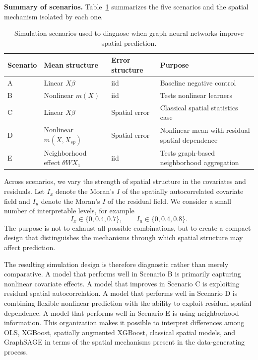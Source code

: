 \documentclass[ASNA, twocolumn]{USG} %
\begin{document}
\noindent \textbf{Summary of scenarios.}
Table~\ref{tab:simulation_scenarios} summarizes the five scenarios and the spatial mechanism isolated by each one.

\begin{table}[t]
\centering
\caption{Simulation scenarios used to diagnose when graph neural networks improve spatial prediction.}
\label{tab:simulation_scenarios}
\begin{tabular}{llll}
\toprule
Scenario & Mean structure & Error structure & Purpose \\
\midrule
A & Linear \(X\beta\) & iid & Baseline negative control \\
B & Nonlinear \(m(X)\) & iid & Tests nonlinear learners \\
C & Linear \(X\beta\) & Spatial error & Classical spatial statistics case \\
D & Nonlinear \(m(X,X_{sp})\) & Spatial error & Nonlinear mean with residual spatial dependence \\
E & Neighborhood effect \(\theta WX_1\) & iid & Tests graph-based neighborhood aggregation \\
\bottomrule
\end{tabular}
\end{table}

Across scenarios, we vary the strength of spatial structure in the covariates and residuals. Let \(I_x\) denote the Moran's \(I\) of the spatially autocorrelated covariate field and \(I_u\) denote the Moran's \(I\) of the residual field. We consider a small number of interpretable levels, for example
\[
I_x \in \{0, 0.4, 0.7\},
\qquad
I_u \in \{0, 0.4, 0.8\}.
\]
The purpose is not to exhaust all possible combinations, but to create a compact design that distinguishes the mechanisms through which spatial structure may affect prediction.

The resulting simulation design is therefore diagnostic rather than merely comparative. A model that performs well in Scenario B is primarily capturing nonlinear covariate effects. A model that improves in Scenario C is exploiting residual spatial autocorrelation. A model that performs well in Scenario D is combining flexible nonlinear prediction with the ability to exploit residual spatial dependence.
A model that performs well in Scenario E is using neighborhood information. This organization makes it possible to interpret differences among OLS, XGBoost, spatially augmented XGBoost, classical spatial models, and GraphSAGE in terms of the spatial mechanisms present in the data-generating process.
\end{document}
